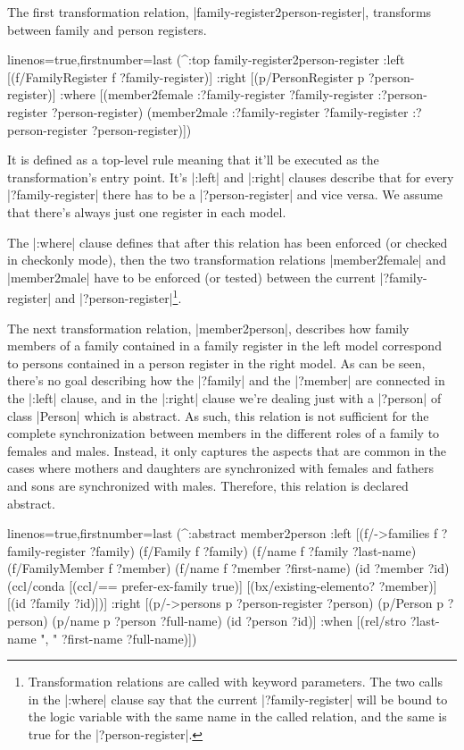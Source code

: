 \documentclass[a4paper]{article}
\newcommand{\code}{\clojureinline}
\begin{document}
The first transformation relation, \code|family-register2person-register|,
transforms between family and person registers.

\begin{clojurecode*}{linenos=true,firstnumber=last}
  (^:top family-register2person-register
   :left  [(f/FamilyRegister f ?family-register)]
   :right [(p/PersonRegister p ?person-register)]
   :where [(member2female :?family-register ?family-register :?person-register ?person-register)
           (member2male :?family-register ?family-register :?person-register ?person-register)])
\end{clojurecode*}

It is defined as a top-level rule meaning that it'll be executed as the
transformation's entry point.  It's \code|:left| and \code|:right| clauses
describe that for every \code|?family-register| there has to be a
\code|?person-register| and vice versa.  We assume that there's always just one
register in each model.

The \code|:where| clause defines that after this relation has been enforced (or
checked in checkonly mode), then the two transformation relations
\code|member2female| and \code|member2male| have to be enforced (or tested)
between the current \code|?family-register| and
\code|?person-register|\footnote{Transformation relations are called with
  keyword parameters.  The two calls in the \code|:where| clause say that the
  current \code|?family-register| will be bound to the logic variable with the
  same name in the called relation, and the same is true for the
  \code|?person-register|.}.

The next transformation relation, \code|member2person|, describes how family
members of a family contained in a family register in the left model correspond
to persons contained in a person register in the right model.  As can be seen,
there's no goal describing how the \code|?family| and the \code|?member| are
connected in the \code|:left| clause, and in the \code|:right| clause we're
dealing just with a \code|?person| of class \code|Person| which is abstract.
As such, this relation is not sufficient for the complete synchronization
between members in the different roles of a family to females and males.
Instead, it only captures the aspects that are common in the cases where
mothers and daughters are synchronized with females and fathers and sons are
synchronized with males.  Therefore, this relation is declared abstract.

\begin{clojurecode*}{linenos=true,firstnumber=last}
  (^:abstract member2person
   :left  [(f/->families f ?family-register ?family)
           (f/Family f ?family)
           (f/name f ?family ?last-name)
           (f/FamilyMember f ?member)
           (f/name f ?member ?first-name)
           (id ?member ?id)
           (ccl/conda
            [(ccl/== prefer-ex-family true)]
            [(bx/existing-elemento? ?member)]
            [(id ?family ?id)])]
   :right [(p/->persons p ?person-register ?person)
           (p/Person p ?person)
           (p/name p ?person ?full-name)
           (id ?person ?id)]
   :when  [(rel/stro ?last-name ", " ?first-name ?full-name)])
\end{clojurecode*}
\end{document}
